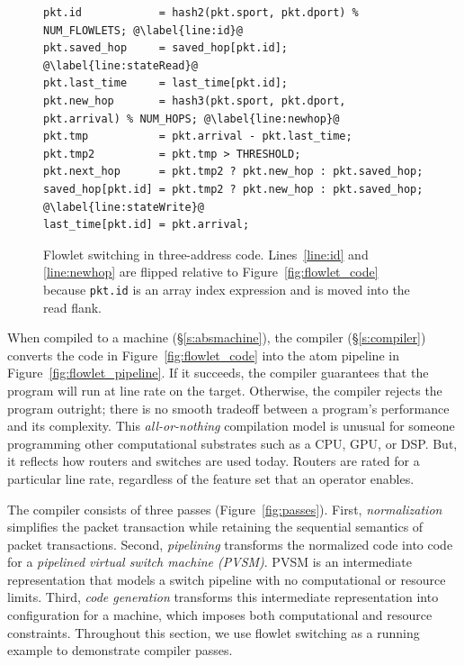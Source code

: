 \begin{figure}[!t]
\begin{minipage}{\textwidth}
\begin{lstlisting}[style=customc]
pkt.id            = hash2(pkt.sport, pkt.dport) % NUM_FLOWLETS; @\label{line:id}@
pkt.saved_hop     = saved_hop[pkt.id]; @\label{line:stateRead}@
pkt.last_time     = last_time[pkt.id];
pkt.new_hop       = hash3(pkt.sport, pkt.dport, pkt.arrival) % NUM_HOPS; @\label{line:newhop}@
pkt.tmp           = pkt.arrival - pkt.last_time;
pkt.tmp2          = pkt.tmp > THRESHOLD;
pkt.next_hop      = pkt.tmp2 ? pkt.new_hop : pkt.saved_hop;
saved_hop[pkt.id] = pkt.tmp2 ? pkt.new_hop : pkt.saved_hop; @\label{line:stateWrite}@
last_time[pkt.id] = pkt.arrival;
\end{lstlisting}
\caption[title2]{Flowlet switching in three-address
code. Lines~\ref{line:id} and \ref{line:newhop} are flipped relative
to Figure~\ref{fig:flowlet_code} because {\tt pkt.id} is an array index expression and is
moved into the read flank.}
\label{fig:three_address}
\end{minipage}
\vspace{-0.5cm}
\end{figure}


When compiled to a \absmachine machine (\S\ref{s:absmachine}), the
\pktlanguage compiler (\S\ref{s:compiler}) converts the code in
Figure~\ref{fig:flowlet_code} into the atom pipeline in
Figure~\ref{fig:flowlet_pipeline}. If it succeeds, the compiler
guarantees that the program will run at line rate on the target.
Otherwise, the compiler rejects the program outright; there is no
smooth tradeoff between a program's performance and its complexity.
This {\em all-or-nothing} compilation model is unusual for someone
programming other computational substrates such as a CPU, GPU, or
DSP. But, it reflects how routers and switches are used today. Routers
are rated for a particular line rate, regardless of the feature set
that an operator enables.


The \pktlanguage compiler consists of three passes
(Figure~\ref{fig:passes}).  First, \textit{normalization} simplifies
the packet transaction while retaining the sequential semantics of
packet transactions. Second, \textit{pipelining} transforms the
normalized code into code for a \textit{pipelined virtual switch
  machine (PVSM)}. PVSM is an intermediate representation that models
a switch pipeline with no computational or resource limits. Third,
\textit{code generation} transforms this intermediate representation
into configuration for a \absmachine machine, which imposes both
computational and resource constraints. Throughout this section, we
use flowlet switching as a running example to demonstrate compiler
passes.

